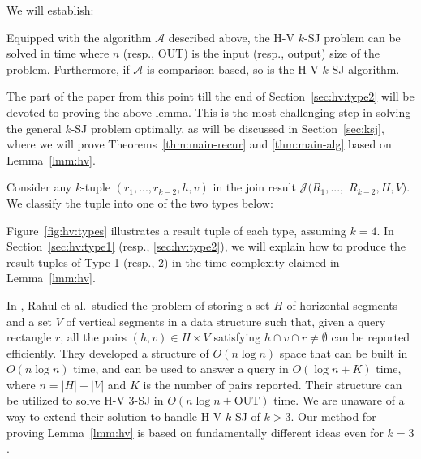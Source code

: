 \documentclass[sigconf]{acmart}
\def\vgap{\vspace{0mm}}
\def\extraspacing{\vspace{1.5mm} \noindent}
\def\A{\mathcal{A}}
\def\J{\mathcal{J}}
\def\out{\mathrm{OUT}}
\begin{document}
\vgap

We will establish:

\begin{lemma} \label{lmm:hv}
    Equipped with the algorithm $\A$ described above, the H-V $k$-SJ problem can be solved in time
    \myeqn{
        O(k) \cdot \big( F_{k-1}(n, \out) + n\log n + k \cdot \out \big) \nn
    }
    where $n$ (resp., $\out$) is the input (resp., output) size of the problem. Furthermore, if $\A$ is comparison-based, so is the H-V $k$-SJ algorithm.
\end{lemma}

The part of the paper from this point till the end of Section~\ref{sec:hv:type2} will be devoted to proving the above lemma. This is the most challenging step in solving the general $k$-SJ problem optimally, as will be discussed in Section~\ref{sec:ksj}, where we will prove Theorems~\ref{thm:main-recur} and \ref{thm:main-alg} based on Lemma~\ref{lmm:hv}.

\vgap



Consider any $k$-tuple $(r_1, ..., r_{k-2}, h, v)$ in the join result $\J(R_1, ...,$ $R_{k-2}, H, V)$. We classify the tuple into one of the two types below:

Figure~\ref{fig:hv:types} illustrates a result tuple of each type, assuming $k = 4$. In Section~\ref{sec:hv:type1} (resp., \ref{sec:hv:type2}), we will explain how to produce the result tuples of Type 1 (resp., 2) in the time complexity claimed in Lemma~\ref{lmm:hv}.

\extraspacing {\bf Remark.} In \cite{rdr+11}, Rahul et al.\ studied the problem of storing a set $H$ of horizontal segments and a set $V$ of vertical segments in a data structure such that, given a query rectangle $r$, all the pairs $(h, v) \in H \times V$ satisfying $h \cap v \cap r \ne \emptyset$ can be reported efficiently. They developed a structure of $O(n \log n)$ space that can be built in $O(n \log n)$ time, and can be used to answer a query in $O(\log n + K)$ time, where $n = |H| + |V|$ and $K$ is the number of pairs reported. Their structure can be utilized to solve H-V 3-SJ in $O(n \log n + \out)$ time. We are unaware of a way to extend their solution to handle H-V $k$-SJ of $k > 3$. Our method for proving Lemma~\ref{lmm:hv} is based on fundamentally different ideas even for $k = 3$.
\end{document}
